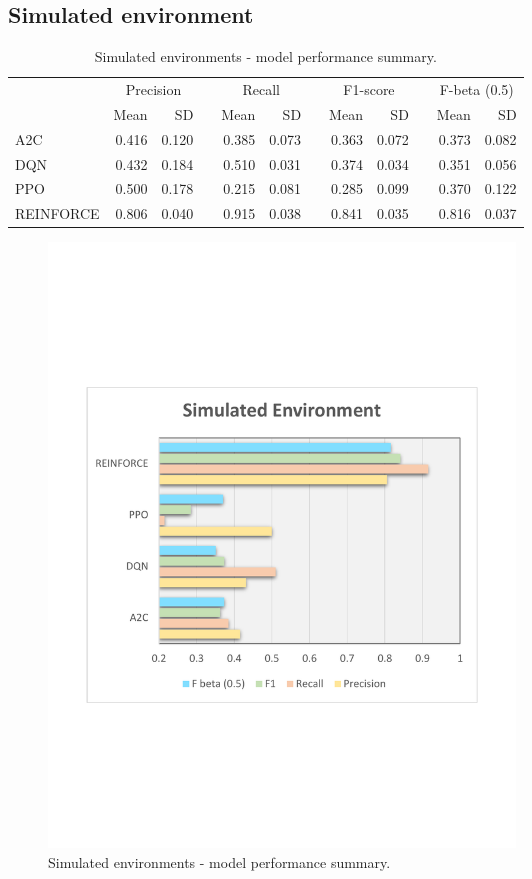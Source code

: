 \documentclass[a4paper, 12pt]{article}
\newcommand{\rowspace}[1]{\renewcommand{\arraystretch}{#1}}
\begin{document}
\subsection{Simulated environment}
\begin{table}[h]\centering\sffamily
	\rowspace{1.3}
	\begin{tabular}{@{}l rr c rr c rr c rr@{}}
		\arrayrulecolor{black!40}\toprule
		& \multicolumn{2}{c}{Precision} & \phantom{i} & \multicolumn{2}{c}{Recall} & \phantom{i} & \multicolumn{2}{c}{F1-score} & \phantom{i} & \multicolumn{2}{c}{F-beta (0.5)} \\
		\cmidrule{2-3} \cmidrule{5-6} \cmidrule{8-9} \cmidrule{11-12} 
		
		&Mean &SD & &Mean &SD & &Mean &SD& &Mean & SD\\ \midrule
		A2C & 0.416 & 0.120 & &0.385 & 0.073 & & 0.363 & 0.072 & &0.373 &0.082 \\
		DQN & 0.432 & 0.184 & &0.510 & 0.031 & & 0.374 & 0.034 & &0.351 &0.056 \\
		PPO & 0.500 & 0.178 & &0.215 & 0.081 & & 0.285 & 0.099 & &0.370 &0.122 \\
		REINFORCE & \textcolor{dblue}{0.806} & 0.040 & &\textcolor{dblue}{0.915} & 0.038 & & \textcolor{dblue}{0.841} & 0.035 & &\textcolor{dblue}{0.816} &0.037 \\
		
		
		\bottomrule
	\end{tabular}
	\caption{Simulated environments - model performance summary.}
	\label{tbl:SimulatedEnv}
\end{table}
\begin{figure}[h]
	\centering
	\includegraphics[width=0.6\textwidth, trim={1.5cm 7cm 1cm 7cm}]{images/SimulatedPlot.pdf}  
	\caption{Simulated environments - model performance summary.}
	\label{fig:SimulatedEnv}
\end{figure}
\end{document}
